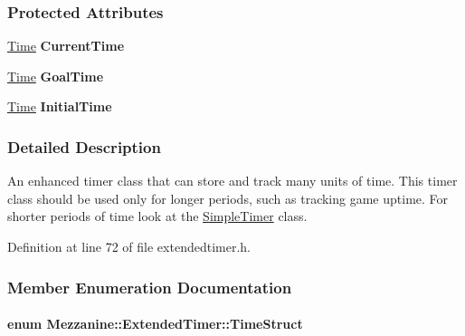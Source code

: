 \subsubsection*{Protected Attributes}
\begin{DoxyCompactItemize}
\item 
\hypertarget{classMezzanine_1_1ExtendedTimer_ae69f409f004bac0f61a36701c4148962}{
\hyperlink{structMezzanine_1_1Time}{Time} {\bfseries CurrentTime}}
\label{classMezzanine_1_1ExtendedTimer_ae69f409f004bac0f61a36701c4148962}

\item 
\hypertarget{classMezzanine_1_1ExtendedTimer_a4701b9a55e5e3429a34f448af8b9a183}{
\hyperlink{structMezzanine_1_1Time}{Time} {\bfseries GoalTime}}
\label{classMezzanine_1_1ExtendedTimer_a4701b9a55e5e3429a34f448af8b9a183}

\item 
\hypertarget{classMezzanine_1_1ExtendedTimer_ab77a055c94642679c83ce37214daff4b}{
\hyperlink{structMezzanine_1_1Time}{Time} {\bfseries InitialTime}}
\label{classMezzanine_1_1ExtendedTimer_ab77a055c94642679c83ce37214daff4b}

\end{DoxyCompactItemize}


\subsubsection{Detailed Description}
An enhanced timer class that can store and track many units of time. This timer class should be used only for longer periods, such as tracking game uptime. For shorter periods of time look at the \hyperlink{classMezzanine_1_1SimpleTimer}{SimpleTimer} class. 

Definition at line 72 of file extendedtimer.h.



\subsubsection{Member Enumeration Documentation}
\hypertarget{classMezzanine_1_1ExtendedTimer_a52119e2da54ea7ae5da0dc1f921a3b61}{
\paragraph[{TimeStruct}]{\setlength{\rightskip}{0pt plus 5cm}enum {\bf Mezzanine::ExtendedTimer::TimeStruct}}\hfill}
\label{classMezzanine_1_1ExtendedTimer_a52119e2da54ea7ae5da0dc1f921a3b61}


